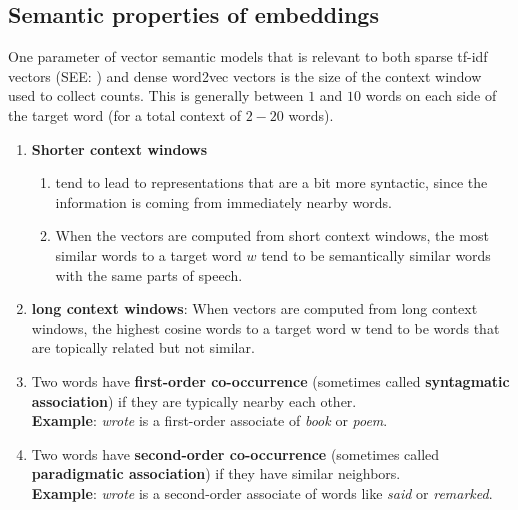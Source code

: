 \subsection{Semantic properties of embeddings \cite{nlp-1}}
One parameter of vector semantic models that is relevant to both sparse tf-idf vectors (SEE: ) and dense word2vec vectors is the size of the context window used to collect counts. This is generally between $1$ and $10$ words on each side of the target word (for a total context of $2-20$ words).
\begin{enumerate}
    \item \textbf{Shorter context windows}
    \begin{enumerate}
        \item tend to lead to representations that are a bit more syntactic, since the information is coming from immediately nearby words.
        \item When the vectors are computed from short context windows, the most similar words to a target word $w$ tend to be semantically similar words with the same parts of speech.
    \end{enumerate}

    \item \textbf{long context windows}: When vectors are computed from long context windows, the highest cosine words to a target word w tend to be words that are topically related but not similar.

    \item Two words have \textbf{first-order co-occurrence} (sometimes called \textbf{syntagmatic association}) if they are typically nearby each other.\\
    \textbf{Example}: \textit{wrote} is a first-order associate of \textit{book} or \textit{poem}.

    \item Two words have \textbf{second-order co-occurrence}  (sometimes called \textbf{paradigmatic association}) if they have similar neighbors.\\
    \textbf{Example}: \textit{wrote} is a second-order associate of words like \textit{said} or \textit{remarked}.

\end{enumerate}

